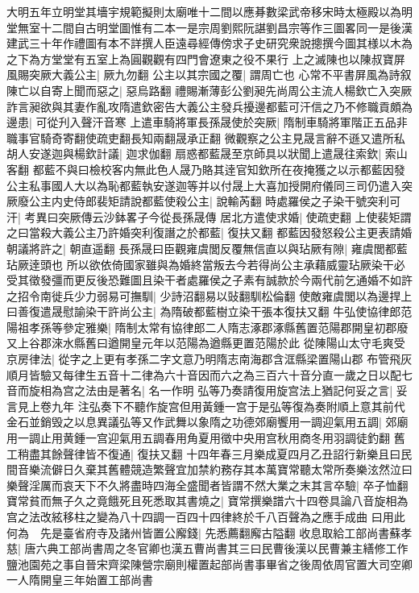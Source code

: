 {大明五年立明堂其墻宇規範擬則太廟唯十二間以應朞數梁武帝移宋時太極殿以為明堂無室十二間自古明堂圖惟有二本一是宗周劉熙阮諶劉昌宗等作三圖畧同一是後漢建武三十年作禮圖有本不詳撰人臣遠尋經傳傍求子史研究衆說摠撰今圖其様以木為之下為方堂堂有五室上為圓觀觀有四門會遼東之役不果行}
上之滅陳也以陳叔寶屏風賜突厥大義公主|{
	厥九勿翻}
公主以其宗國之覆|{
	謂周亡也}
心常不平書屏風為詩叙陳亡以自寄上聞而惡之|{
	惡烏路翻}
禮賜漸薄彭公劉昶先尚周公主流人楊欽亡入突厥詐言昶欲與其妻作亂攻隋遣欽密告大義公主發兵擾邊都藍可汗信之乃不修職貢頗為邊患|{
	可從刋入聲汗音寒}
上遣車騎將軍長孫晟使於突厥|{
	隋制車騎將軍階正五品非職事官騎奇寄翻使疏吏翻長知兩翻晟承正翻}
微觀察之公主見晟言辭不遜又遣所私胡人安遂迦與楊欽計議|{
	迦求伽翻}
扇惑都藍晟至京師具以狀聞上遣晟往索欽|{
	索山客翻}
都藍不與曰檢校客内無此色人晟乃賂其逹官知欽所在夜掩獲之以示都藍因發公主私事國人大以為恥都藍執安遂迦等并以付晟上大喜加授開府儀同三司仍遣入突厥廢公主内史侍郎裴矩請說都藍使殺公主|{
	說輸芮翻}
時處羅侯之子染干號突利可汗|{
	考異曰突厥傳云沙鉢畧子今從長孫晟傳}
居北方遣使求婚|{
	使疏吏翻}
上使裴矩謂之曰當殺大義公主乃許婚突利復譖之於都藍|{
	復扶又翻}
都藍因發怒殺公主更表請婚朝議將許之|{
	朝直遥翻}
長孫晟曰臣觀雍虞閭反覆無信直以與玷厥有隙|{
	雍虞閭都藍玷厥逹頭也}
所以欲依倚國家雖與為婚終當叛去今若得尚公主承藉威靈玷厥染干必受其徵發彊而更反後恐難圖且染干者處羅侯之子素有誠款於今兩代前乞通婚不如許之招令南徙兵少力弱易可撫馴|{
	少詩沼翻易以䜴翻馴松倫翻}
使敵雍虞閭以為邊捍上曰善復遣晟慰諭染干許尚公主|{
	為隋破都藍樹立染干張本復扶又翻}
牛弘使協律郎范陽祖孝孫等參定雅樂|{
	隋制太常有協律郎二人隋志涿郡涿縣舊置范陽郡開皇初郡廢又上谷郡淶水縣舊曰遒開皇元年以范陽為遒縣更置范陽於此}
從陳陽山太守毛爽受京房律法|{
	從字之上更有孝孫二字文意乃明隋志南海郡含洭縣梁置陽山郡}
布管飛灰順月皆驗又每律生五音十二律為六十音因而六之為三百六十音分直一歲之日以配七音而旋相為宫之法由是著名|{
	名一作明}
弘等乃奏請復用旋宫法上猶記何妥之言|{
	妥言見上卷九年}
注弘奏下不聽作旋宫但用黃鍾一宫于是弘等復為奏附順上意其前代金石並銷毁之以息異議弘等又作武舞以象隋之功德郊廟饗用一調迎氣用五調|{
	郊廟用一調止用黄鍾一宫迎氣用五調春用角夏用徵中央用宫秋用商冬用羽調徒釣翻}
舊工稍盡其餘聲律皆不復通|{
	復扶又翻}
十四年春三月樂成夏四月乙丑詔行新樂且曰民間音樂流僻日久棄其舊體競造繁聲宜加禁約務存其本萬寶常聽太常所奏樂泫然泣曰樂聲淫厲而哀天下不久將盡時四海全盛聞者皆謂不然大業之末其言卒驗|{
	卒子恤翻}
寶常貧而無子久之竟餓死且死悉取其書燒之|{
	寶常撰樂譜六十四卷具論八音旋相為宫之法改絃移柱之變為八十四調一百四十四律終於千八百聲為之應手成曲}
曰用此何為　先是臺省府寺及諸州皆置公廨錢|{
	先悉薦翻廨古隘翻}
收息取給工部尚書蘇孝慈|{
	唐六典工部尚書周之冬官卿也漢五曹尚書其三曰民曹後漢以民曹兼主繕修工作鹽池園苑之事自晉宋齊梁陳營宗廟則權置起部尚書事畢省之後周依周官置大司空卿一人隋開皇三年始置工部尚書}
